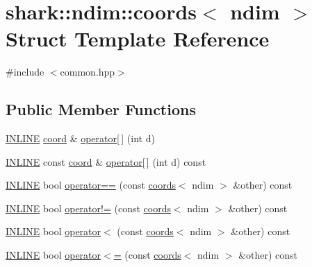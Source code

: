 \hypertarget{structshark_1_1ndim_1_1coords}{}\section{shark\+:\+:ndim\+:\+:coords$<$ ndim $>$ Struct Template Reference}
\label{structshark_1_1ndim_1_1coords}


{\ttfamily \#include $<$common.\+hpp$>$}

\subsection*{Public Member Functions}
\begin{DoxyCompactItemize}
\item 
\hyperlink{common_8hpp_a2eb6f9e0395b47b8d5e3eeae4fe0c116}{I\+N\+L\+I\+NE} \hyperlink{namespaceshark_a767a92d5dd82cb82266473bff42fa6d9}{coord} \& \hyperlink{structshark_1_1ndim_1_1coords_a1fbf31166313ae261a6dbfe4435dc7ff}{operator\mbox{[}$\,$\mbox{]}} (int d)
\item 
\hyperlink{common_8hpp_a2eb6f9e0395b47b8d5e3eeae4fe0c116}{I\+N\+L\+I\+NE} const \hyperlink{namespaceshark_a767a92d5dd82cb82266473bff42fa6d9}{coord} \& \hyperlink{structshark_1_1ndim_1_1coords_ae3904f69cf3d34187a3bee566d9178d4}{operator\mbox{[}$\,$\mbox{]}} (int d) const
\item 
\hyperlink{common_8hpp_a2eb6f9e0395b47b8d5e3eeae4fe0c116}{I\+N\+L\+I\+NE} bool \hyperlink{structshark_1_1ndim_1_1coords_a32fe0dc972d14e7b8bc9c0581faa3708}{operator==} (const \hyperlink{structshark_1_1ndim_1_1coords}{coords}$<$ ndim $>$ \&other) const
\item 
\hyperlink{common_8hpp_a2eb6f9e0395b47b8d5e3eeae4fe0c116}{I\+N\+L\+I\+NE} bool \hyperlink{structshark_1_1ndim_1_1coords_af85a0dc03aefa526e583697f3db845cb}{operator!=} (const \hyperlink{structshark_1_1ndim_1_1coords}{coords}$<$ ndim $>$ \&other) const
\item 
\hyperlink{common_8hpp_a2eb6f9e0395b47b8d5e3eeae4fe0c116}{I\+N\+L\+I\+NE} bool \hyperlink{structshark_1_1ndim_1_1coords_a2dadd54e3584169adb3ecc53af004cba}{operator$<$} (const \hyperlink{structshark_1_1ndim_1_1coords}{coords}$<$ ndim $>$ \&other) const
\item 
\hyperlink{common_8hpp_a2eb6f9e0395b47b8d5e3eeae4fe0c116}{I\+N\+L\+I\+NE} bool \hyperlink{structshark_1_1ndim_1_1coords_a0e9ca552b8eafb1f562a88935d3a3bd5}{operator$<$=} (const \hyperlink{structshark_1_1ndim_1_1coords}{coords}$<$ ndim $>$ \&other) const

\end{DoxyCompactItemize}

